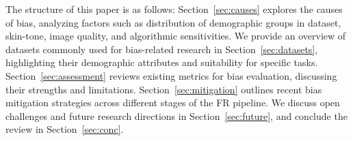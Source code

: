 The structure of this paper is as follows: Section~\ref{sec:causes} explores the
causes of bias, analyzing factors such as distribution of demographic groups in
dataset, skin-tone, image quality, and algorithmic sensitivities. We provide an
overview of datasets commonly used for bias-related research in
Section~\ref{sec:datasets}, highlighting their demographic attributes and
suitability for specific tasks. Section~\ref{sec:assessment} reviews existing
metrics for bias evaluation, discussing their strengths and limitations.
Section~\ref{sec:mitigation} outlines recent bias mitigation strategies across
different stages of the FR pipeline. We discuss open challenges and future
research directions in Section~\ref{sec:future}, and conclude the review in
Section~\ref{sec:conc}.

